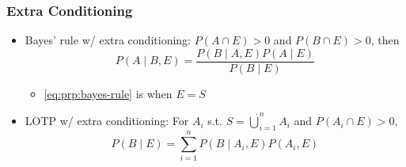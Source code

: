\subsubsection*{Extra Conditioning}
\begin{itemize}
    \item Bayes' rule w/ extra conditioning: $P(A\cap E)>0$ and $P(B\cap E)>0$, then
    \begin{equation}
        P(A\mid B,E)=\frac{P(B\mid A,E)P(A\mid E)}{P(B\mid E)}
    \end{equation}
    \begin{itemize}
        \item \ref{eq:prp:bayes-rule} is when $E=S$
    \end{itemize}
    \item LOTP w/ extra conditioning: For $A_i$ s.t. $S=\dot{\bigcup}_{i=1}^nA_i$ and $P(A_i\cap E)>0$,
    \begin{equation}
        P(B\mid E)=\sum_{i=1}^nP(B\mid A_i,E)P(A_i,E)
    \end{equation}
\end{itemize}

